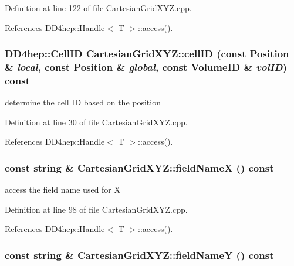 Definition at line 122 of file CartesianGridXYZ.cpp.

References DD4hep::Handle$<$ T $>$::access().\hypertarget{class_d_d4hep_1_1_geometry_1_1_cartesian_grid_x_y_z_a44f2e080527e66de8098d96f383f8cfe}{
\subsubsection[{cellID}]{\setlength{\rightskip}{0pt plus 5cm}DD4hep::CellID CartesianGridXYZ::cellID (const {\bf Position} \& {\em local}, \/  const {\bf Position} \& {\em global}, \/  const VolumeID \& {\em volID}) const}}
\label{class_d_d4hep_1_1_geometry_1_1_cartesian_grid_x_y_z_a44f2e080527e66de8098d96f383f8cfe}


determine the cell ID based on the position 

Definition at line 30 of file CartesianGridXYZ.cpp.

References DD4hep::Handle$<$ T $>$::access().\hypertarget{class_d_d4hep_1_1_geometry_1_1_cartesian_grid_x_y_z_a95577a5b7e43b9293d92c6eae167c921}{
\subsubsection[{fieldNameX}]{\setlength{\rightskip}{0pt plus 5cm}const {\bf string} \& CartesianGridXYZ::fieldNameX () const}}
\label{class_d_d4hep_1_1_geometry_1_1_cartesian_grid_x_y_z_a95577a5b7e43b9293d92c6eae167c921}


access the field name used for X 

Definition at line 98 of file CartesianGridXYZ.cpp.

References DD4hep::Handle$<$ T $>$::access().\hypertarget{class_d_d4hep_1_1_geometry_1_1_cartesian_grid_x_y_z_a4adc175349203a45fd567d56427633dd}{
\subsubsection[{fieldNameY}]{\setlength{\rightskip}{0pt plus 5cm}const {\bf string} \& CartesianGridXYZ::fieldNameY () const}}
\label{class_d_d4hep_1_1_geometry_1_1_cartesian_grid_x_y_z_a4adc175349203a45fd567d56427633dd}


